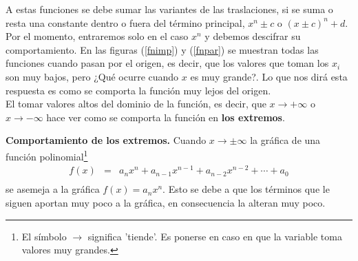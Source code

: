 A estas funciones se debe sumar las variantes de las traslaciones, si se suma o resta una constante dentro o fuera del término principal, $x^{n}\pm c$ o $(x\pm c)^{n}+d$. \\
Por el momento, entraremos solo en el caso $x^{n}$ y debemos descifrar su comportamiento. En las figuras (\ref{fnimp}) y (\ref{fnpar}) se muestran todas las funciones cuando pasan por el origen, es decir, que los valores que toman los $x_{i}$ son muy bajos, pero ¿Qué ocurre cuando $x$ es muy grande?. Lo que nos dirá esta respuesta es como se comporta la función muy lejos del origen.\\
El tomar valores altos del dominio de la función, es decir, que $x\longrightarrow +\infty$ o $x\longrightarrow -\infty$ hace ver como se comporta la función en \textbf{los extremos}.

\begin{mydef}
\label{extrefn0}
\textbf{Comportamiento de los extremos.} Cuando $x\longrightarrow\pm\infty$ la gráfica de una función polinomial\footnote{El símbolo $\rightarrow$ significa 'tiende'. Es ponerse en caso en que la variable toma valores muy grandes.}
\begin{eqnarray*}
f(x)&=&a_{n}x^{n}+a_{n-1}x^{n-1}+a_{n-2}x^{n-2}+\cdots +a_{0} \\
\end{eqnarray*}
se asemeja a la gráfica $f(x)=a_{n}x^{n}$. Esto se debe a que los términos que le siguen aportan muy poco a la gráfica, en consecuencia la alteran muy poco.
\end{mydef}


